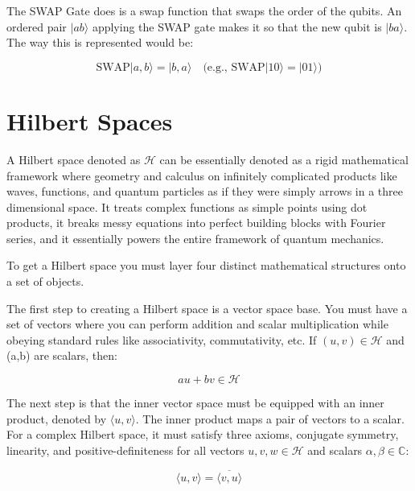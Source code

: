 \documentclass[12pt]{article}
\begin{document}
The SWAP Gate does is a swap function that swaps the order of the qubits. An ordered pair $|ab\rangle$ applying the SWAP gate makes it so that the new qubit is $|ba\rangle$. The way this is represented would be:

\begin{equation*}
\text{SWAP}\lvert a, b \rangle = \lvert b, a \rangle \quad \text{(e.g., } \text{SWAP}\lvert 10 \rangle = \lvert 01 \rangle\text{)}
\end{equation*}

\section{Hilbert Spaces}

A Hilbert space denoted as $\mathcal{H}$ can be essentially denoted as a rigid mathematical framework where geometry and calculus on infinitely complicated products like waves, functions, and quantum particles as if they were simply arrows in a three dimensional space. It treats complex functions as simple points using dot products, it breaks messy equations into perfect building blocks with Fourier series, and it essentially powers the entire framework of quantum mechanics. 

To get a Hilbert space you must layer four distinct mathematical structures onto a set of objects.

The first step to creating a Hilbert space is a vector space base. You must have a set of vectors where you can perform addition and scalar multiplication while obeying standard rules like associativity, commutativity, etc. If $(u,v) \in \mathcal{H}$ and (a,b) are scalars, then:

\begin{equation}
au + bv \in \mathcal{H} \tag{6}
\end{equation}
\vspace{0.1cm}

The next step is that the inner vector space must be equipped with an inner product, denoted by $\langle u,v\rangle$. The inner product maps a pair of vectors to a scalar. For a complex Hilbert space, it must satisfy three axioms, conjugate symmetry, linearity, and positive-definiteness for all vectors $u,v,w \in \mathcal{H}$ and scalars $\alpha , \beta \in \mathbb{C}$:

\begin{equation}
\langle u,v \rangle = \overline{\langle v,u \rangle }\tag{7}
\end{equation}
\end{document}
